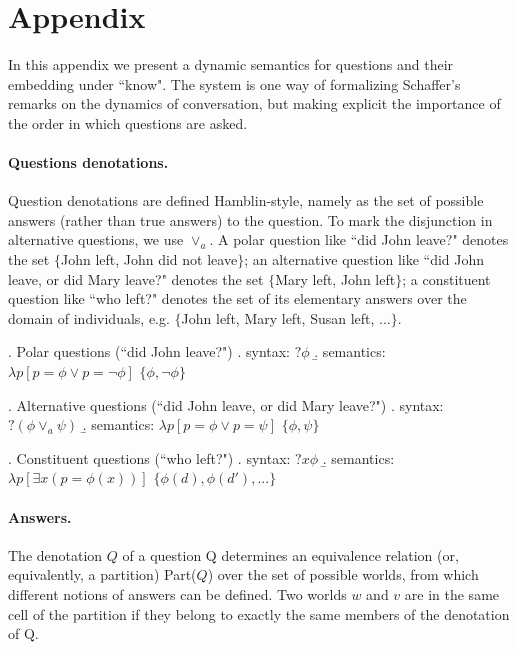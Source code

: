  \section*{Appendix}

In this appendix we present a dynamic semantics for questions and
their embedding under ``know". The system is one way of
formalizing Schaffer's remarks on the dynamics of conversation,
but making explicit the importance of the order in which questions
are
asked. %


 \paragraph{Questions denotations.}

Question denotations are defined Hamblin-style, namely as the set
of possible answers (rather than true answers) to the question. To
mark the disjunction in alternative questions, we use $\vee_a$. A
polar question like ``did John leave?" denotes the set $\{$John
left, John did not leave$\}$; an alternative question like ``did
John leave, or did Mary leave?" denotes the set $\{$Mary left,
John left$\}$; a constituent question like ``who left?" denotes
the set of its elementary answers over the domain of individuals,
e.g. $\{$John left, Mary left, Susan left, ...$\}$.

 \ex. Polar questions (``did John leave?")
 \a. syntax: $?\phi$
 \b. semantics: $\lambda p  [p=\phi \vee p=\neg \phi]$ \hfill $\{\phi, \neg \phi\}$

 \ex. Alternative questions (``did John leave, or did Mary leave?")
  \a. syntax: $?(\phi  \vee_a \psi)$
 \b. semantics: $\lambda p  [p=\phi \vee p= \psi]$ \hfill $\{\phi,   \psi\}$

\ex. Constituent questions (``who left?")
 \a. syntax: $?x \phi   $
 \b. semantics: $\lambda p  [\exists x (p=\phi(x))]$ \hfill $\{\phi(d),   \phi(d'),...\}$


\paragraph{Answers.} The denotation $Q$ of a question Q determines
an equivalence relation (or, equivalently, a partition) Part($Q$)
over the set of possible worlds, from which different notions of
answers can be defined. Two worlds $w$ and $v$ are in the same
cell of the partition if they belong to exactly the same members
of the denotation of Q.

